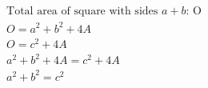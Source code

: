 \documentclass[preview]{standalone}
\begin{document}
\begin{align*}
\text{Total area of square with sides $a + b$: O} \\ O = a^2 + b^2 + 4A \\ O = c^2 + 4A \\ a^2 + b^2 + 4A = c^2 + 4A \\ a^2 + b^2 = c^2
\end{align*}
\end{document}
